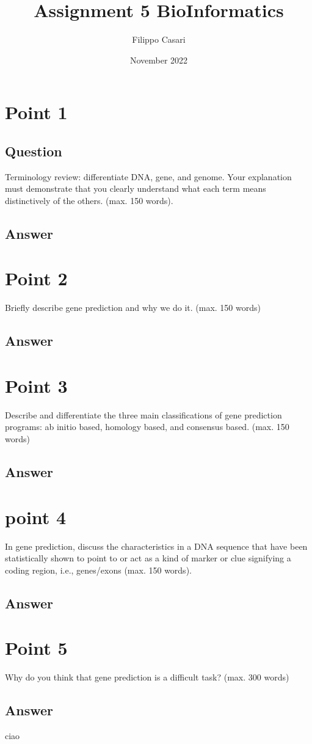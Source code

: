 \documentclass{article}
\title{Assignment 5 BioInformatics}
\author{Filippo Casari}
\date{November 2022}
\begin{document}
\maketitle

\section{Point 1}
\subsection*{Question}
Terminology review: differentiate DNA, gene, and genome. Your explanation
must demonstrate that you clearly understand what each term means distinctively
of the others. (max. 150 words).
\subsection*{Answer}

\section{Point 2}
Briefly describe gene prediction and why we do it. (max. 150 words)
\subsection*{Answer}
\section{Point 3}
Describe and differentiate the three main classifications of gene prediction
programs: ab initio based, homology based, and consensus based. (max. 150
words)
\subsection*{Answer}

\section{point 4}
In gene prediction, discuss the characteristics in a DNA sequence that have been
statistically shown to point to or act as a kind of marker or clue signifying a coding
region, i.e., genes/exons (max. 150 words).
\subsection*{Answer}

\section{Point 5}
Why do you think that gene prediction is a difficult task? (max. 300 words)
\subsection*{Answer}
ciao
\end{document}
